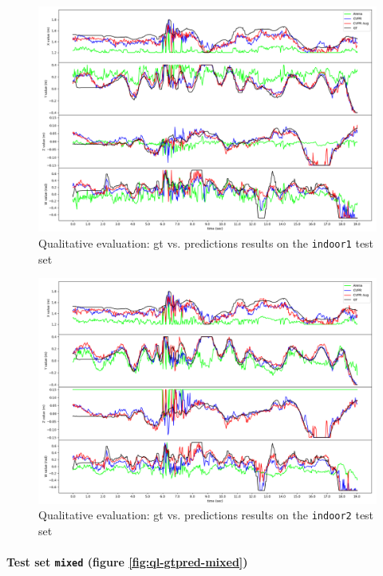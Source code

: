 \begin{figure}[!h]
	\centering
	\includegraphics[width=1 \textwidth]{"contents/images/06-gtpred-indoor1"}
	\caption[Qualitative evaluation: \gls{gt} vs. predictions results on the \texttt{indoor1} test set]{Qualitative evaluation: \gls{gt} vs. predictions results on the \texttt{indoor1} test set}
	\label{fig:ql-gtpred-indoor1}
\end{figure}

\begin{figure}[H]
	\centering
	\includegraphics[width=1 \textwidth]{"contents/images/06-gtpred-indoor2"}
	\caption[Qualitative evaluation: \gls{gt} vs. predictions results on the \texttt{indoor2} test set]{Qualitative evaluation: \gls{gt} vs. predictions results on the \texttt{indoor2} test set}
	\label{fig:ql-gtpred-indoor2}
\end{figure}


\paragraph*{Test set \texttt{mixed} (figure \ref{fig:ql-gtpred-mixed})}


